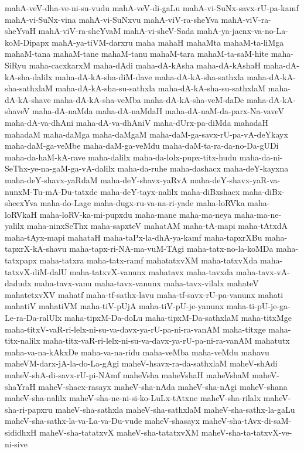 {mahA-veV-dha-ve-ni-su-vudu
mahA-veV-di-gaLu
mahA-vi-SuNx-savx-rU-pa-kamf
mahA-vi-SuNx-vina
mahA-vi-SuNxvu
mahA-viV-ra-sheYva
mahA-viV-ra-sheYvaH
mahA-viV-ra-sheYvaM
mahA-vi-sheV-Sada
mahA-ya-jacnx-va-no-La-koM-Dipapx
mahA-ya-tiVM-darxru
maha
mahaH
mahaMta
mahaM-ta-liMga
mahaM-tana
mahaM-tane
mahaM-tanu
mahaM-tara
mahaM-ta-saM-hite
maha-SiRyu
maha-cacxkarxM
maha-dAdi
maha-dA-kAsha
maha-dA-kAshaH
maha-dA-kA-sha-dalilx
maha-dA-kA-sha-diM-dave
maha-dA-kA-sha-sathxla
maha-dA-kA-sha-sathxlaM
maha-dA-kA-sha-su-sathxla
maha-dA-kA-sha-su-sathxlaM
maha-dA-kA-shave
maha-dA-kA-sha-veMba
maha-dA-kA-sha-veM-daDe
maha-dA-kA-shaveV
maha-dA-naMda
maha-dA-naMdaH
maha-dA-naM-da-parx-Na-vaveV
maha-dA-va-dhAni
maha-dA-va-dhAniV
maha-dUrx-pa-diMda
mahadaH
mahadaM
maha-daMga
maha-daMgaM
maha-daM-ga-savx-rU-pa-vA-deYkayx
maha-daM-ga-veMbe
maha-daM-ga-veMdu
maha-daM-ta-ra-da-no-Da-gUDi
maha-da-haM-kA-rave
maha-dalilx
maha-da-lolx-pupx-titx-hudu
maha-da-ni-SeThx-ye-na-gaM-ga-vA-dalilx
maha-da-ruhe
maha-dashacx
maha-deY-kayxna
maha-deY-shavx-yaRdaM
maha-deY-shavx-yaRvA
maha-deY-shavx-yaR-va-nunxM-Tu-mA-Du-tatxde
maha-deY-tayx-nalilx
maha-diBxshacx
maha-diBx-shecxYva
maha-do-Lage
maha-dugx-ru-va-na-ri-yade
maha-loRVka
maha-loRVkaH
maha-loRV-ka-mi-pupxdu
maha-mane
maha-ma-neya
maha-ma-ne-yalilx
maha-ninxSeThx
maha-sapxteV
mahatAM
maha-tA-mapi
maha-tAtxdA
maha-tAyx-mapi
mahataH
maha-taPx-la-dhA-ya-kamf
maha-tapxrXBu
maha-tapxrX-kA-shavu
maha-tapx-ri-NA-ma-vuM-TAgi
maha-tatx-no-la-koMDa
maha-tatxpapx
maha-tatxra
maha-tatx-ramf
mahatatxvXM
maha-tatxvXda
maha-tatxvX-diM-dalU
maha-tatxvX-vanunx
mahatavx
maha-tavxda
maha-tavx-vA-dadudx
maha-tavx-vanu
maha-tavx-vanunx
maha-tavx-vilalx
mahateV
mahatetxvXV
mahatf
maha-tf-sathx-lavu
maha-tf-savx-rU-pa-vanunx
mahati
mahatiV
mahatiVM
maha-tiV-pUjA
maha-tiV-pU-je-yanunx
maha-ti-pU-je-ga-Le-ra-Da-ralUlx
maha-tipxM-Da-doLu
maha-tipxM-Da-sathxlaM
maha-titxMge
maha-titxV-vaR-ri-lelx-ni-su-va-davx-ya-rU-pa-ni-ra-vanAM
maha-titxge
maha-titx-nalilx
maha-titx-vaR-ri-lelx-ni-su-va-davx-ya-rU-pa-ni-ra-vanAM
mahatutx
maha-va-na-kAkxDe
maha-va-na-ridu
maha-veMba
maha-veMdu
mahavu
maheVM-darx-jA-la-do-La-gAgi
maheV-hsavx-ra-da-sathxlaM
maheV-shAdi
maheV-shA-di-savx-rU-pi-NAmf
maheVsha
maheVshaH
maheVshaM
maheV-shaYraH
maheV-shacx-rasayx
maheV-sha-nAda
maheV-sha-nAgi
maheV-shana
maheV-sha-nalilx
maheV-sha-ne-ni-si-ko-LuLx-tAtxne
maheV-sha-rilalx
maheV-sha-ri-papxru
maheV-sha-sathxla
maheV-sha-sathxlaM
maheV-sha-sathx-la-gaLu
maheV-sha-sathx-la-va-La-va-Du-vude
maheV-shasayx
maheV-sha-tAvx-di-saM-sididhxH
maheV-sha-tatatxvX
maheV-sha-tatatxvXM
maheV-sha-ta-tatxvX-ve-ni-sive
}
